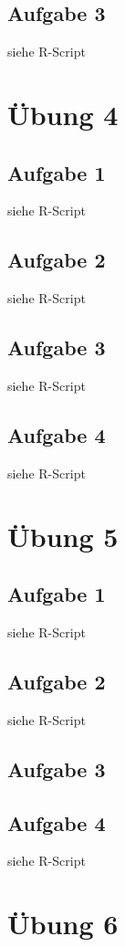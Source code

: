 \documentclass[13pt,a4paper]{article}
\begin{document}
\subsection{Aufgabe 3}
siehe R-Script

\newpage
\section{Übung 4}
\subsection{Aufgabe 1}
siehe R-Script

\subsection{Aufgabe 2}
siehe R-Script

\subsection{Aufgabe 3}
siehe R-Script

\subsection{Aufgabe 4}
siehe R-Script

\newpage
\section{Übung 5}
\subsection{Aufgabe 1}
siehe R-Script

\subsection{Aufgabe 2}
siehe R-Script

\subsection{Aufgabe 3}

\subsection{Aufgabe 4}
siehe R-Script

\newpage
\section{Übung 6}
\end{document}
